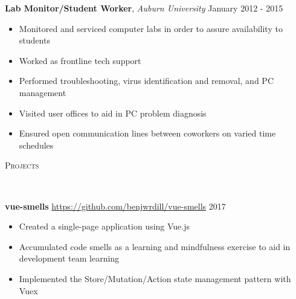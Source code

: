 \documentclass[9pt]{article}
\newenvironment{changemargin}[2]{%
  \begin{list}{}{%
    \setlength{\topsep}{0pt}%
    \setlength{\leftmargin}{#1}%
    \setlength{\rightmargin}{#2}%
    \setlength{\listparindent}{\parindent}%
    \setlength{\itemindent}{\parindent}%
    \setlength{\parsep}{\parskip}%
  }%
  \item[]}{\end{list}
}
\newcommand{\lineover}{
	\begin{changemargin}{-0.05in}{-0.05in}
		\vspace*{-8pt}
		\hrulefill \\
		\vspace*{-2pt}
	\end{changemargin}
}
\newcommand{\header}[1]{
	\begin{changemargin}{-0.5in}{-0.5in}
		\scshape{#1}\\
  	\lineover
	\end{changemargin}
}
\newenvironment{body} {
	\vspace*{-16pt}
	\begin{changemargin}{-0.25in}{-0.5in}
  }	
	{\end{changemargin}
}
\begin{document}
\begin{body}
	\textbf{Lab Monitor/Student Worker}, \emph{Auburn University} \hfill January 2012 - 2015\\
	\vspace*{-4pt}
	\begin{itemize} \itemsep -0pt  %
		\item Monitored and serviced computer labs in order to assure availability to students
		\item Worked as frontline tech support
		\item Performed troubleshooting, virus identification and removal, and PC management
		\item Visited user offices to aid in PC problem diagnosis
		\item Ensured open communication lines between coworkers on varied time schedules
	\end{itemize}
	\vspace{17pt}
\end{body}

\smallskip

\header{Projects}

\begin{body}
	\vspace{17pt}
	\textbf{vue-smells} \url{https://github.com/benjwrdill/vue-smells} \hfill{} 2017
	\begin{itemize}
		\item{Created a single-page application using Vue.js}
		\item{Accumulated code smells as a learning and mindfulness exercise to aid in development team learning}
		\item{Implemented the Store/Mutation/Action state management pattern with Vuex}
	\end{itemize}
\end{body}

%
\end{document}
